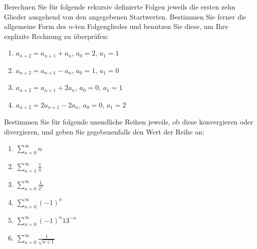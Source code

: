 
Berechnen Sie für folgende rekursiv definierte Folgen jeweils die ersten zehn Glieder ausgehend von den angegebenen Startwerten. Bestimmen Sie ferner die allgemeine Form des $n$-ten Folgengliedes und benutzen Sie diese, um Ihre explizite Rechnung zu überprüfen:
\begin{enumerate}
\item $a_{n+2}=a_{n+1}+a_{n}$, $a_0=2$, $a_1=1$
\item $a_{n+2}=a_{n+1}-a_{n}$, $a_0=1$, $a_1=0$
\item $a_{n+2}=a_{n+1}+2a_{n}$, $a_0=0$, $a_1=1$
\item $a_{n+2}=2a_{n+1}-2a_{n}$, $a_0=0$, $a_1=2$
\end{enumerate}





Bestimmen Sie für folgende unendliche Reihen jeweils, ob diese konvergieren oder divergieren, und geben Sie gegebenenfalls den Wert der Reihe an:\\
\parbox{0.5\textwidth}{\begin{enumerate}
\item $\sum_{n=0}^\infty n$
\item $\sum_{n=1}^\infty \frac{1}{n}$
\item $\sum_{n=0}^\infty \frac{1}{2^n}$
\end{enumerate}}\parbox{0.5\textwidth}{\begin{enumerate}\setcounter{enumi}{3}
\item $\sum_{n=0}^\infty (-1)^n$
\item $\sum_{n=0}^\infty (-1)^n 13^{-n}$
\item $\sum_{n=0}^\infty \frac{1}{\sqrt{n+1}}$
\end{enumerate}}
